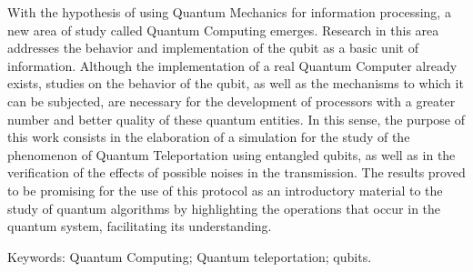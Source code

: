\begin{resumo}[Abstract] %

  With the hypothesis of using Quantum Mechanics for information processing, a new area of ​​study called Quantum Computing emerges. Research in this area addresses the behavior and implementation of the qubit as a basic unit of information. Although the implementation of a real Quantum Computer already exists, studies on the behavior of the qubit, as well as the mechanisms to which it can be subjected, are necessary for the development of processors with a greater number and better quality of these quantum entities. In this sense, the purpose of this work consists in the elaboration of a simulation for the study of the phenomenon of Quantum Teleportation using entangled qubits, as well as in the verification of the effects of possible noises in the transmission. The results proved to be promising for the use of this protocol as an introductory material to the study of quantum algorithms by highlighting the operations that occur in the quantum system, facilitating its understanding.
  \vspace{\onelineskip}

  \noindent
  Keywords: Quantum Computing; Quantum teleportation; qubits.
\end{resumo}

\cleardoublepage

